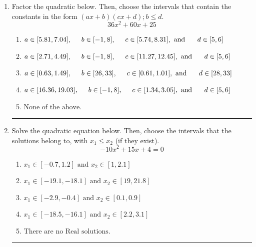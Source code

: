 \documentclass[14pt]{extbook}
\newcommand{\litem}[1]{\item#1\hspace*{-1cm}\rule{\textwidth}{0.4pt}}
\begin{document}
\begin{enumerate}
{\begin{enumerate}[label=\Alph*.]
\end{enumerate} }
\litem{
Factor the quadratic below. Then, choose the intervals that contain the constants in the form $(ax+b)(cx+d); b \leq d.$\[ 36x^{2} +60 x + 25 \]\begin{enumerate}[label=\Alph*.]
\item \( a \in [5.81, 7.04], \hspace*{5mm} b \in [-1, 8], \hspace*{5mm} c \in [5.74, 8.31], \text{ and } \hspace*{5mm} d \in [5, 6] \)
\item \( a \in [2.71, 4.49], \hspace*{5mm} b \in [-1, 8], \hspace*{5mm} c \in [11.27, 12.45], \text{ and } \hspace*{5mm} d \in [5, 6] \)
\item \( a \in [0.63, 1.49], \hspace*{5mm} b \in [26, 33], \hspace*{5mm} c \in [0.61, 1.01], \text{ and } \hspace*{5mm} d \in [28, 33] \)
\item \( a \in [16.36, 19.03], \hspace*{5mm} b \in [-1, 8], \hspace*{5mm} c \in [1.34, 3.05], \text{ and } \hspace*{5mm} d \in [5, 6] \)
\item \( \text{None of the above.} \)

\end{enumerate} }
\litem{
Solve the quadratic equation below. Then, choose the intervals that the solutions belong to, with $x_1 \leq x_2$ (if they exist).\[ -10x^{2} +15 x + 4 = 0 \]\begin{enumerate}[label=\Alph*.]
\item \( x_1 \in [-0.7, 1.2] \text{ and } x_2 \in [1, 2.1] \)
\item \( x_1 \in [-19.1, -18.1] \text{ and } x_2 \in [19, 21.8] \)
\item \( x_1 \in [-2.9, -0.4] \text{ and } x_2 \in [0.1, 0.9] \)
\item \( x_1 \in [-18.5, -16.1] \text{ and } x_2 \in [2.2, 3.1] \)
\item \( \text{There are no Real solutions.} \)


\end{enumerate}}
\end{enumerate}
\end{document}
